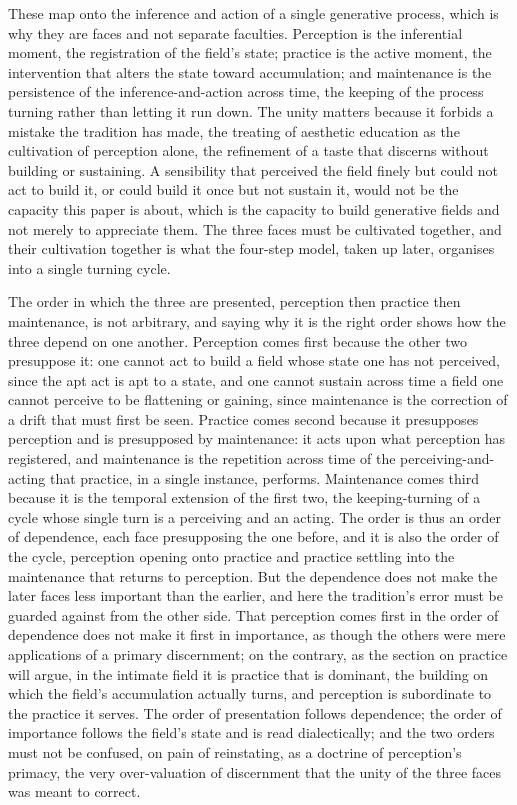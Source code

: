 These map onto the inference and action of a single generative process, which is why they are faces and not separate faculties. Perception is the inferential moment, the registration of the field's state; practice is the active moment, the intervention that alters the state toward accumulation; and maintenance is the persistence of the inference-and-action across time, the keeping of the process turning rather than letting it run down. The unity matters because it forbids a mistake the tradition has made, the treating of aesthetic education as the cultivation of perception alone, the refinement of a taste that discerns without building or sustaining. A sensibility that perceived the field finely but could not act to build it, or could build it once but not sustain it, would not be the capacity this paper is about, which is the capacity to build generative fields and not merely to appreciate them. The three faces must be cultivated together, and their cultivation together is what the four-step model, taken up later, organises into a single turning cycle.

The order in which the three are presented, perception then practice then maintenance, is not arbitrary, and saying why it is the right order shows how the three depend on one another. Perception comes first because the other two presuppose it: one cannot act to build a field whose state one has not perceived, since the apt act is apt to a state, and one cannot sustain across time a field one cannot perceive to be flattening or gaining, since maintenance is the correction of a drift that must first be seen. Practice comes second because it presupposes perception and is presupposed by maintenance: it acts upon what perception has registered, and maintenance is the repetition across time of the perceiving-and-acting that practice, in a single instance, performs. Maintenance comes third because it is the temporal extension of the first two, the keeping-turning of a cycle whose single turn is a perceiving and an acting. The order is thus an order of dependence, each face presupposing the one before, and it is also the order of the cycle, perception opening onto practice and practice settling into the maintenance that returns to perception. But the dependence does not make the later faces less important than the earlier, and here the tradition's error must be guarded against from the other side. That perception comes first in the order of dependence does not make it first in importance, as though the others were mere applications of a primary discernment; on the contrary, as the section on practice will argue, in the intimate field it is practice that is dominant, the building on which the field's accumulation actually turns, and perception is subordinate to the practice it serves. The order of presentation follows dependence; the order of importance follows the field's state and is read dialectically; and the two orders must not be confused, on pain of reinstating, as a doctrine of perception's primacy, the very over-valuation of discernment that the unity of the three faces was meant to correct.

